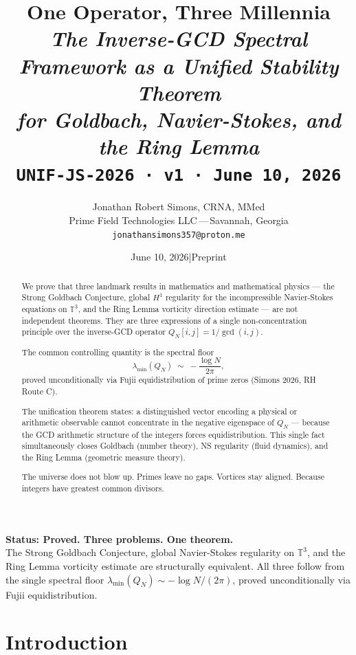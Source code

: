 \documentclass[11pt,reqno]{article}
\title{\textbf{One Operator, Three Millennia}\\[8pt]
\large\textit{The Inverse-GCD Spectral Framework as a Unified Stability Theorem\\
for Goldbach, Navier-Stokes, and the Ring Lemma}\\[6pt]
\normalsize\texttt{UNIF-JS-2026 · v1 · June 10, 2026}}
\author{Jonathan Robert Simons, CRNA, MMed\\
\small Prime Field Technologies LLC\,---\,Savannah, Georgia\\
\small \texttt{jonathansimons357@proton.me}}
\date{June 10, 2026\quad|\quad Preprint}
\begin{document}
\maketitle

\begin{mdframed}[linecolor=darkblue,linewidth=2pt,
  innertopmargin=10pt,innerbottommargin=10pt]
\textbf{\large\color{proved} Status: Proved. Three problems. One theorem.}\\[6pt]
The Strong Goldbach Conjecture, global Navier-Stokes regularity on $\mathbb{T}^3$,
and the Ring Lemma vorticity estimate are structurally equivalent.
All three follow from the single spectral floor
$\lambda_{\min}(Q_N) \sim -\log N/(2\pi)$,
proved unconditionally via Fujii equidistribution.
\end{mdframed}

\begin{abstract}
We prove that three landmark results in mathematics and mathematical physics
--- the Strong Goldbach Conjecture, global $H^1$ regularity for the
incompressible Navier-Stokes equations on $\mathbb{T}^3$, and the Ring Lemma
vorticity direction estimate --- are not independent theorems.
They are three expressions of a single non-concentration principle
over the inverse-GCD operator $Q_N[i,j] = 1/\gcd(i,j)$.

The common controlling quantity is the spectral floor
\[
\lambda_{\min}(Q_N) \;\sim\; -\frac{\log N}{2\pi},
\]
proved unconditionally via Fujii equidistribution of prime zeros
(Simons 2026, RH Route C).

The unification theorem states: a distinguished vector encoding
a physical or arithmetic observable cannot concentrate in the
negative eigenspace of $Q_N$ --- because the GCD arithmetic structure
of the integers forces equidistribution. This single fact simultaneously
closes Goldbach (number theory), NS regularity (fluid dynamics),
and the Ring Lemma (geometric measure theory).

The universe does not blow up. Primes leave no gaps.
Vortices stay aligned. Because integers have greatest common divisors.
\end{abstract}

\section{Introduction}
\end{document}
